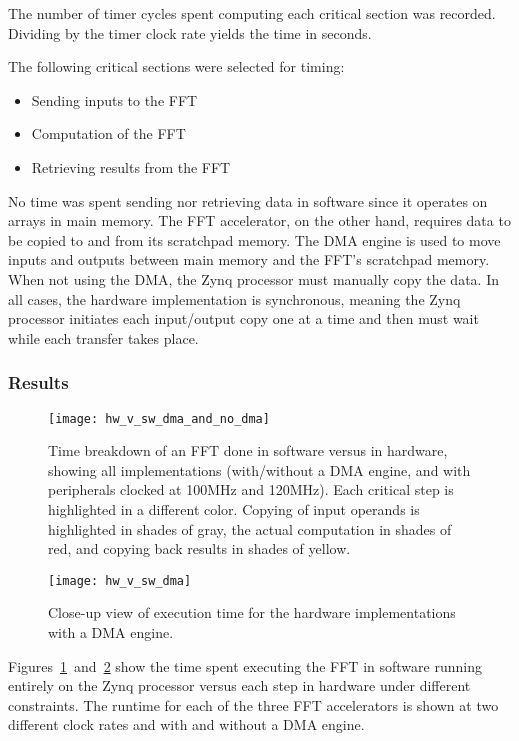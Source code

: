 The number of timer cycles spent computing each critical section was recorded. Dividing by the timer clock rate yields the time in seconds.
\begin{minipage}{\linewidth}
The following critical sections were selected for timing:
\begin{itemize}
\item Sending inputs to the FFT
\item Computation of the FFT
\item Retrieving results from the FFT\\
\end{itemize}
\end{minipage}

No time was spent sending nor retrieving data in software since it operates on arrays in main memory. The FFT accelerator, on the other hand, requires data to be copied to and from its scratchpad memory. The DMA engine is used to move inputs and outputs between main memory and the FFT's scratchpad memory. When not using the DMA, the Zynq processor must manually copy the data. In all cases, the hardware implementation is synchronous, meaning the Zynq processor initiates each input/output copy one at a time and then must wait while each transfer takes place.

\subsubsection{Results}
\begin{figure}
\texttt{[image: hw\_v\_sw\_dma\_and\_no\_dma]}\\
\caption{Time breakdown of an FFT done in software versus in hardware, showing all implementations (with/without a DMA engine, and with peripherals clocked at 100MHz and 120MHz). Each critical step is highlighted in a different color. Copying of input operands is highlighted in shades of gray, the actual computation in shades of red, and copying back results in shades of yellow.}
\label{fig:hw_sw_all}
\end{figure}

\begin{figure}
\texttt{[image: hw\_v\_sw\_dma]}\\
\caption{Close-up view of execution time for the hardware implementations with a DMA engine.}
\label{fig:hw_sw_dma}
\end{figure}

Figures~\ref{fig:hw_sw_all}~and~\ref{fig:hw_sw_dma} show the time spent executing the FFT in software running entirely on the Zynq processor versus each step in hardware under different constraints. The runtime for each of the three FFT accelerators is shown at two different clock rates and with and without a DMA engine.

